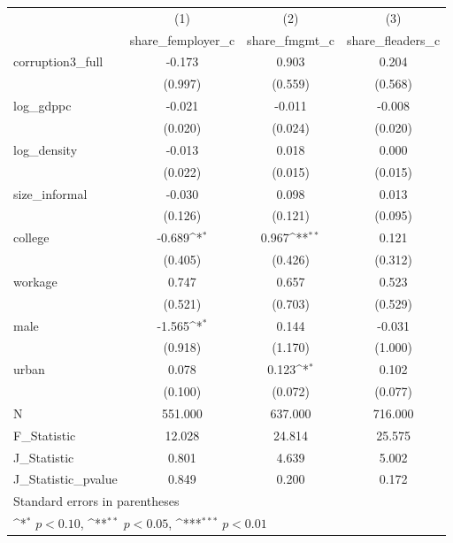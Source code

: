 {
\def\sym#1{\ifmmode^{#1}\else\(^{#1}\)\fi}
\begin{tabular}{l*{3}{c}}
\hline\hline
            &\multicolumn{1}{c}{(1)}&\multicolumn{1}{c}{(2)}&\multicolumn{1}{c}{(3)}\\
            &\multicolumn{1}{c}{share\_femployer\_c}&\multicolumn{1}{c}{share\_fmgmt\_c}&\multicolumn{1}{c}{share\_fleaders\_c}\\
\hline
corruption3\_full&      -0.173         &       0.903         &       0.204         \\
            &     (0.997)         &     (0.559)         &     (0.568)         \\
[1em]
log\_gdppc   &      -0.021         &      -0.011         &      -0.008         \\
            &     (0.020)         &     (0.024)         &     (0.020)         \\
[1em]
log\_density &      -0.013         &       0.018         &       0.000         \\
            &     (0.022)         &     (0.015)         &     (0.015)         \\
[1em]
size\_informal&      -0.030         &       0.098         &       0.013         \\
            &     (0.126)         &     (0.121)         &     (0.095)         \\
[1em]
college     &      -0.689\sym{*}  &       0.967\sym{**} &       0.121         \\
            &     (0.405)         &     (0.426)         &     (0.312)         \\
[1em]
workage     &       0.747         &       0.657         &       0.523         \\
            &     (0.521)         &     (0.703)         &     (0.529)         \\
[1em]
male        &      -1.565\sym{*}  &       0.144         &      -0.031         \\
            &     (0.918)         &     (1.170)         &     (1.000)         \\
[1em]
urban       &       0.078         &       0.123\sym{*}  &       0.102         \\
            &     (0.100)         &     (0.072)         &     (0.077)         \\
\hline
N           &     551.000         &     637.000         &     716.000         \\
F\_Statistic &      12.028         &      24.814         &      25.575         \\
J\_Statistic &       0.801         &       4.639         &       5.002         \\
J\_Statistic\_pvalue&       0.849         &       0.200         &       0.172         \\
\hline\hline
\multicolumn{4}{l}{\footnotesize Standard errors in parentheses}\\
\multicolumn{4}{l}{\footnotesize \sym{*} \(p<0.10\), \sym{**} \(p<0.05\), \sym{***} \(p<0.01\)}\\
\end{tabular}
}
